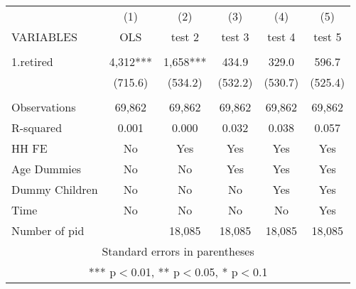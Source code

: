 \begin{tabular}{lccccc} \hline
 & (1) & (2) & (3) & (4) & (5) \\
VARIABLES & OLS & test 2 & test 3 & test 4 & test 5 \\ \hline
 &  &  &  &  &  \\
1.retired & 4,312*** & 1,658*** & 434.9 & 329.0 & 596.7 \\
 & (715.6) & (534.2) & (532.2) & (530.7) & (525.4) \\
 &  &  &  &  &  \\
Observations & 69,862 & 69,862 & 69,862 & 69,862 & 69,862 \\
R-squared & 0.001 & 0.000 & 0.032 & 0.038 & 0.057 \\
HH FE & No & Yes & Yes & Yes & Yes \\
Age Dummies & No & No & Yes & Yes & Yes \\
Dummy Children & No & No & No & Yes & Yes \\
Time & No & No & No & No & Yes \\
 Number of pid &  & 18,085 & 18,085 & 18,085 & 18,085 \\ \hline
\multicolumn{6}{c}{ Standard errors in parentheses} \\
\multicolumn{6}{c}{ *** p$<$0.01, ** p$<$0.05, * p$<$0.1} \\
\end{tabular}
